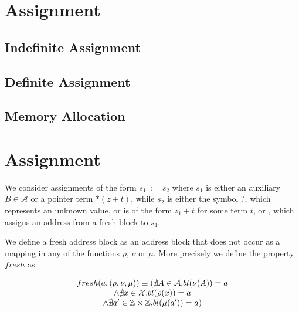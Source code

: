 \section{Assignment}

\subsection{Indefinite Assignment}

\subsection{Definite Assignment}

\subsection{Memory Allocation}

\section{Assignment}


We consider assignments of the form $s_1\,{:=}\,s_2$ where $s_1$ is either an auxiliary $B \in \mathcal{A}$ or a pointer term $*(z+t)$, while $s_2$ is either the symbol $?$, which represents an unknown value, or is of the form $z_1 + t$ for some term $t$, or \malloc, which assigns an address from a fresh block to $s_1$.

We define a fresh address block as an address block that does not occur as a mapping in any of the functions $\rho$, $\nu$ or $\mu$. More precisely we define the property $fresh$ as:

\[ \begin{array}{c}
		fresh(a, (\rho,\nu,\mu)) \equiv
		(\nexists A\in \mathcal{A} . bl(\nu(A)) = a     \\
		\land \nexists x\in \mathcal{X}. bl(\rho(x)) = a \\
		\land \nexists a'\in \mathbb{Z} \times \mathbb{Z} . bl(\mu(a')) = a)
	\end{array}
\]

